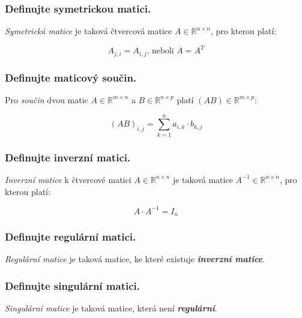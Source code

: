 \documentclass[10pt,a4paper]{article}
\begin{document}
\subsubsection{Definujte symetrickou matici.}

\textit{Symetrická matice} je taková čtvercová matice $A \in \mathbb{R}^{n \times n}$, pro kterou platí:

\begin{equation*}
A_{j,i} = A_{i, j} \text{, neboli } A = A^T
\end{equation*}

\subsubsection{Definujte maticový součin.}

Pro \textit{součin} dvou matic $A \in \mathbb{R}^{m \times n}$ a $B \in \mathbb{R}^{n \times p}$ platí $(AB) \in \mathbb{R}^{m \times p}$:

\begin{equation*}
(AB)_{i,j} = \displaystyle \sum_{k = 1}^n a_{i,k} \cdot b_{k,j}
\end{equation*}

\subsubsection{Definujte inverzní matici.}

\textit{Inverzní matice} k čtvercové matici $A \in \mathbb{R}^{n \times n}$  je taková matice $A^{-1} \in \mathbb{R}^{n \times n}$, pro kterou platí:

\begin{equation*}
A \cdot A^{-1} = I_n 
\end{equation*}
 
\subsubsection{Definujte regulární matici.}

\textit{Regulární matice} je taková matice, ke které existuje \textbf{\textit{inverzní matice}}.

\subsubsection{Definujte singulární matici.}

\textit{Singulární matice} je taková matice, která není \textbf{\textit{regulární}}.
\end{document}
